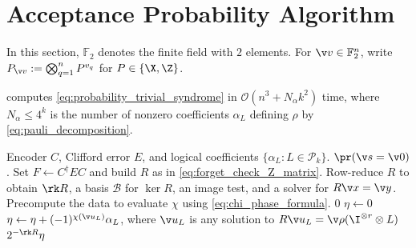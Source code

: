 \section{Acceptance Probability Algorithm}
\label{sec:acceptance_probability_algorithm}
In this section,
$\mathbb{F}_2$ denotes the finite field with $2$ elements.
For $\v v \in \mathbb{F}_2^n$,
write $P_{\v v} :=\bigotimes_{q =1}^n P^{v_q}$ for $P \in\{\X, \Z\}$.

\begin{prop}
\label{prop:probability_runtime}
 computes
\cref{eq:probability_trivial_syndrome}
in $\mathcal O(n^3+N_\alpha k^2)$ time,
where $N_\alpha \le 4^k$ is the number of nonzero coefficients
$\alpha_L$ defining $\rho$ by \cref{eq:pauli_decomposition}.
\end{prop}

\begin{algorithm}[H]
\caption{Probability of a trivial syndrome after suffering a Clifford error.}
\label{alg:probability_trivial_syndrome}
\begin{algorithmic}[1]
\Require Encoder $C$, Clifford error $E$,
and logical coefficients $\{\alpha_L:L\in\mathcal P_k\}$.
\Ensure $\pr(\v s=\v 0)$.
\State Set $F\gets C^\dag EC$ and build $R$ as in \cref{eq:forget_check_Z_matrix}.
\State Row-reduce $R$ to obtain $\rk R$, a basis $\mathcal{B}$ for $\ker R$,
an image test, and a solver for $R\v x=\v y$.
\State Precompute the data to evaluate $\chi$ using
\cref{eq:chi_phase_formula}.
		\State \Return $0$
	\EndIf
\EndFor
\State $\eta\gets0$
	\label{line:image_membership_test}
		\State $\eta\gets\eta+(-1)^{\chi(\v u_L)}\alpha_L$,
		where $\v u_L$ is any solution to
		$R\v u_L =\v \rho(\I^{\otimes r} \otimes L)$
	\EndIf
\EndFor
\State \Return $2^{-\rk R}\eta$
\end{algorithmic}
\end{algorithm}

